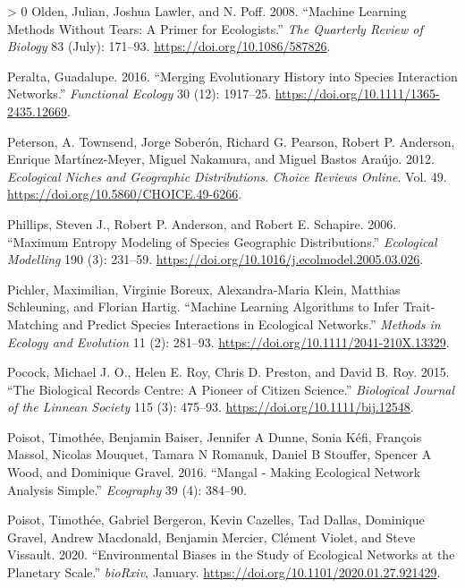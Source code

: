 \documentclass[12pt]{article}
\newlength{\cslhangindent}
\newenvironment{CSLReferences}[3] %
 {%
  \setlength{\parindent}{0pt}
  \ifodd #1 \everypar{\setlength{\hangindent}{\cslhangindent}}\ignorespaces\fi
  \ifnum #2 > 0
  \setlength{\parskip}{#2\baselineskip}
  \fi
 }%
 {}
\begin{document}
\begin{CSLReferences}{1}{0}
\leavevmode\hypertarget{ref-Olden2008MacLea}{}%
Olden, Julian, Joshua Lawler, and N. Poff. 2008. {``Machine Learning
Methods Without Tears: A Primer for Ecologists.''} \emph{The Quarterly
Review of Biology} 83 (July): 171--93.
\url{https://doi.org/10.1086/587826}.

\leavevmode\hypertarget{ref-Peralta2016MerEvo}{}%
Peralta, Guadalupe. 2016. {``Merging Evolutionary History into Species
Interaction Networks.''} \emph{Functional Ecology} 30 (12): 1917--25.
\url{https://doi.org/10.1111/1365-2435.12669}.

\leavevmode\hypertarget{ref-Peterson2012EcoNic}{}%
Peterson, A. Townsend, Jorge Soberón, Richard G. Pearson, Robert P.
Anderson, Enrique Martínez-Meyer, Miguel Nakamura, and Miguel Bastos
Araújo. 2012. \emph{Ecological Niches and Geographic Distributions}.
\emph{Choice Reviews Online}. Vol. 49.
\url{https://doi.org/10.5860/CHOICE.49-6266}.

\leavevmode\hypertarget{ref-Phillips2006MaxEnt}{}%
Phillips, Steven J., Robert P. Anderson, and Robert E. Schapire. 2006.
{``Maximum Entropy Modeling of Species Geographic Distributions.''}
\emph{Ecological Modelling} 190 (3): 231--59.
\url{https://doi.org/10.1016/j.ecolmodel.2005.03.026}.

\leavevmode\hypertarget{ref-Pichler2019MacLea}{}%
Pichler, Maximilian, Virginie Boreux, Alexandra-Maria Klein, Matthias
Schleuning, and Florian Hartig. {``Machine Learning Algorithms to Infer
Trait-Matching and Predict Species Interactions in Ecological
Networks.''} \emph{Methods in Ecology and Evolution} 11 (2): 281--93.
\url{https://doi.org/10.1111/2041-210X.13329}.

\leavevmode\hypertarget{ref-Pocock2015BioRec}{}%
Pocock, Michael J. O., Helen E. Roy, Chris D. Preston, and David B. Roy.
2015. {``The Biological Records Centre: A Pioneer of Citizen Science.''}
\emph{Biological Journal of the Linnean Society} 115 (3): 475--93.
\url{https://doi.org/10.1111/bij.12548}.

\leavevmode\hypertarget{ref-Poisot2016ManMak}{}%
Poisot, Timothée, Benjamin Baiser, Jennifer A Dunne, Sonia Kéfi,
François Massol, Nicolas Mouquet, Tamara N Romanuk, Daniel B Stouffer,
Spencer A Wood, and Dominique Gravel. 2016. {``Mangal - Making
Ecological Network Analysis Simple.''} \emph{Ecography} 39 (4): 384--90.

\leavevmode\hypertarget{ref-Poisot2020EnvBia}{}%
Poisot, Timothée, Gabriel Bergeron, Kevin Cazelles, Tad Dallas,
Dominique Gravel, Andrew Macdonald, Benjamin Mercier, Clément Violet,
and Steve Vissault. 2020. {``Environmental Biases in the Study of
Ecological Networks at the Planetary Scale.''} \emph{bioRxiv}, January.
\url{https://doi.org/10.1101/2020.01.27.921429}.


\end{CSLReferences}
\end{document}
